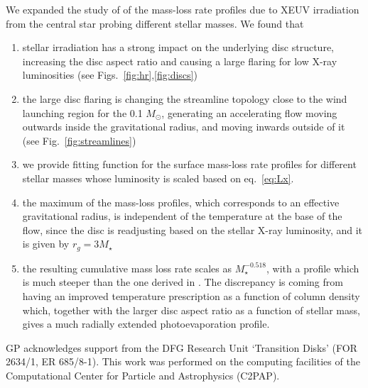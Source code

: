 \documentclass{aa}
\begin{document}
  We expanded the study of  of the mass-loss rate profiles due to XEUV irradiation from the central star probing different stellar masses.
  We found that

   \begin{enumerate}
      \item stellar irradiation has a strong impact on the underlying disc structure, increasing the disc aspect ratio and causing a large flaring for low X-ray luminosities (see Figs.~\ref{fig:hr},\ref{fig:discs})
      \item the large disc flaring is changing the streamline topology close to the wind launching region for the 0.1 $M_\odot$, generating an accelerating flow moving outwards inside the gravitational radius, and moving inwards outside of it (see Fig.~\ref{fig:streamlines})
      \item we provide fitting function for the surface mass-loss rate profiles for different stellar masses whose luminosity is scaled based on eq.~\ref{eq:Lx}.
      \item the maximum of the mass-loss profiles, which corresponds to an effective gravitational radius, is independent of the temperature at the base of the flow, since the disc is readjusting based on the stellar X-ray luminosity, and it is given by $r_g=3M_\star$
      \item the resulting cumulative mass loss rate scales as $M_\star^{-0.518}$, with a profile which is much steeper than the one derived in \citep{2012MNRAS.422.1880O}. The discrepancy is coming from having an improved temperature prescription as a function of column density which, together with the larger disc aspect ratio as a function of stellar mass, gives a much radially extended photoevaporation profile.
   \end{enumerate}

\begin{acknowledgements}
    GP acknowledges support from the DFG Research Unit ‘Transition Disks’ (FOR 2634/1, ER 685/8-1).
    This work was performed on the computing facilities of the Computational Center for Particle and Astrophysics (C2PAP).
\end{acknowledgements}
\end{document}
